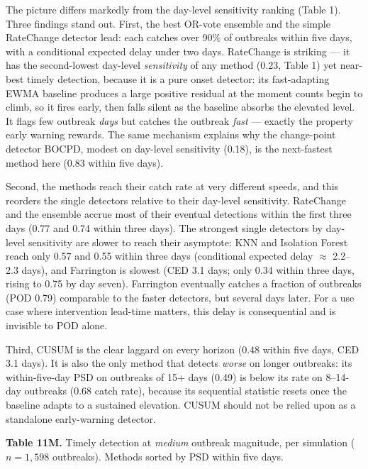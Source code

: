 \documentclass[11pt]{article}
\newcommand{\tabcap}[2]{\noindent\textbf{#1} #2\par\smallskip}
\begin{document}
The picture differs markedly from the day-level sensitivity ranking (Table 1). Three findings stand out. First, the best OR-vote ensemble and the simple RateChange detector lead: each catches over 90\% of outbreaks within five days, with a conditional expected delay under two days. RateChange is striking --- it has the second-lowest day-level \textit{sensitivity} of any method (0.23, Table 1) yet near-best timely detection, because it is a pure onset detector: its fast-adapting EWMA baseline produces a large positive residual at the moment counts begin to climb, so it fires early, then falls silent as the baseline absorbs the elevated level. It flags few outbreak \textit{days} but catches the outbreak \textit{fast} --- exactly the property early warning rewards. The same mechanism explains why the change-point detector BOCPD, modest on day-level sensitivity (0.18), is the next-fastest method here (0.83 within five days).

Second, the methods reach their catch rate at very different speeds, and this reorders the single detectors relative to their day-level sensitivity. RateChange and the ensemble accrue most of their eventual detections within the first three days (0.77 and 0.74 within three days). The strongest single detectors by day-level sensitivity are slower to reach their asymptote: KNN and Isolation Forest reach only 0.57 and 0.55 within three days (conditional expected delay $\approx$ 2.2--2.3 days), and Farrington is slowest (CED 3.1 days; only 0.34 within three days, rising to 0.75 by day seven). Farrington eventually catches a fraction of outbreaks (POD 0.79) comparable to the faster detectors, but several days later. For a use case where intervention lead-time matters, this delay is consequential and is invisible to POD alone.

Third, CUSUM is the clear laggard on every horizon (0.48 within five days, CED 3.1 days). It is also the only method that detects \textit{worse} on longer outbreaks: its within-five-day PSD on outbreaks of 15+ days (0.49) is below its rate on 8--14-day outbreaks (0.68 catch rate), because its sequential statistic resets once the baseline adapts to a sustained elevation. CUSUM should not be relied upon as a standalone early-warning detector.

\tabcap{Table 11M.}{Timely detection at \textit{medium} outbreak magnitude, per simulation ($n = 1{,}598$ outbreaks). Methods sorted by PSD within five days.}
\end{document}
